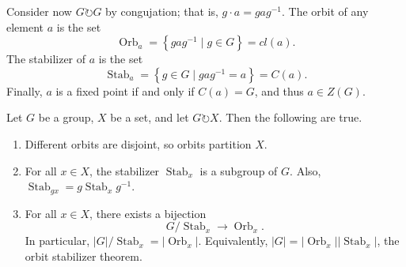 Consider now $G\circlearrowright G$ by congujation; that is, $g\cdot a=gag^{-1}$. The orbit of any element $a$ is the set
\[
	\operatorname{Orb}_a=\left\{ gag^{-1} \mid g\in G \right\} =cl(a)
.\]
The stabilizer of $a$ is the set
\[
	\operatorname{Stab}_a=\left\{ g\in G \mid gag^{-1}=a \right\} =C(a) 
.\]
Finally,  $a$ is a fixed point if and only if $C(a)=G$, and thus $a\in Z(G)$.
\begin{theorem}\label{thm:the theorem}
	Let $G$ be a group, $X$ be a set, and let $G\circlearrowright X$. Then the following are true.
	\begin{enumerate}
		\item Different orbits are disjoint, so orbits partition $X$.
		\item For all $x\in X$, the stabilizer $\operatorname{Stab}_x $ is a subgroup of $G$. Also, $\operatorname{Stab}_{gx}=g \operatorname{Stab}_x g^{-1} $.
		\item For all $x\in X$, there exists a bijection
			\[
				G /\operatorname{Stab}_x \to \operatorname{Orb}_x
			.\]
		In particular, $\left| G \right| / \operatorname{Stab}_x = \left| \operatorname{Orb}_x \right| $. Equivalently, $\left| G \right| =\left| \operatorname{Orb}_x \right| \left| \operatorname{Stab}_x \right| $, the orbit stabilizer theorem.
	\end{enumerate}
\end{theorem}
